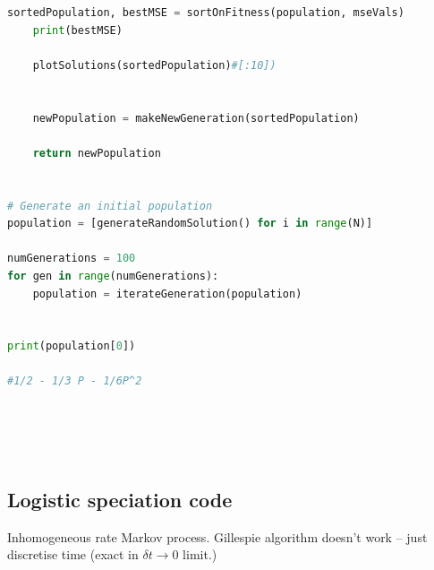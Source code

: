 \begin{lstlisting}[language=Python]
    sortedPopulation, bestMSE = sortOnFitness(population, mseVals)
    print(bestMSE)
    
    plotSolutions(sortedPopulation)#[:10])

    
    newPopulation = makeNewGeneration(sortedPopulation)
    
    return newPopulation

    
# Generate an initial population
population = [generateRandomSolution() for i in range(N)]

numGenerations = 100
for gen in range(numGenerations):
    population = iterateGeneration(population)
    
    
print(population[0])

#1/2 - 1/3 P - 1/6P^2
    
    
    
    

\end{lstlisting}











\subsection*{Logistic speciation code}

Inhomogeneous rate Markov process.  Gillespie algorithm doesn't work -- just discretise time (exact in $\delta t \to 0$ limit.)

